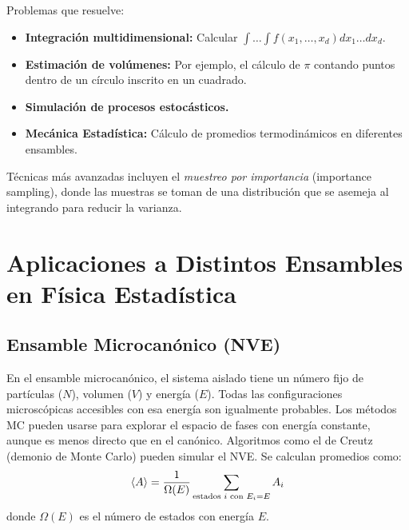 \documentclass[11pt,a4paper]{article}
\begin{document}
Problemas que resuelve:
\begin{itemize}
    \item \textbf{Integración multidimensional:} Calcular $\displaystyle \int \dots \int f(x_1, \dots, x_d) dx_1 \dots dx_d$.
    \item \textbf{Estimación de volúmenes:} Por ejemplo, el cálculo de $\pi$ contando puntos dentro de un círculo inscrito en un cuadrado.
    \item \textbf{Simulación de procesos estocásticos.}
    \item \textbf{Mecánica Estadística:} Cálculo de promedios termodinámicos en diferentes ensambles.
\end{itemize}
Técnicas más avanzadas incluyen el \emph{muestreo por importancia} (importance sampling), donde las muestras se toman de una distribución que se asemeja al integrando para reducir la varianza.

\section{Aplicaciones a Distintos Ensambles en Física Estadística}
\subsection{Ensamble Microcanónico (NVE)}
En el ensamble microcanónico, el sistema aislado tiene un número fijo de partículas ($N$), volumen ($V$) y energía ($E$). Todas las configuraciones microscópicas accesibles con esa energía son igualmente probables.
Los métodos MC pueden usarse para explorar el espacio de fases con energía constante, aunque es menos directo que en el canónico. Algoritmos como el de Creutz (demonio de Monte Carlo) pueden simular el NVE. Se calculan promedios como:
\[ \expval{A} = \frac{1}{\Omega(E)} \sum_{\text{estados } i \text{ con } E_i=E} A_i \]
donde $\Omega(E)$ es el número de estados con energía $E$.
\end{document}
